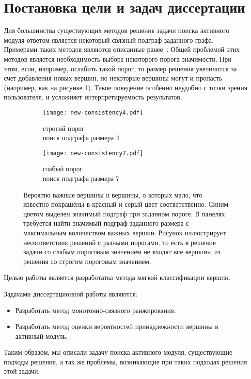 \section{Постановка цели и задач диссертации}
Для большинства существующих методов решения задачи поиска активного модуля
ответом является некоторый связный подграф заданного графа. Примерами таких
методов являются описанные
ранее~\cite{Ideker2002,Dittrich2008a,Alcaraz2012,Sergushichev2016}.  Общей
проблемой этих методов является необходимость выбора некоторого порога
значимости. При этом, если, например, ослабить такой порог, то размер решения
увеличится за счет добавления новых вершин, но некоторые вершины могут
и пропасть (например, как на рисунке \ref{fig:consistency}). Такое поведение
особенно неудобно с точки зрения пользователя, и усложняет интерпретируемость
результатов.
\begin{figure}
    \begin{subfigure}{.45\textwidth}
        \centering
        \texttt{[image: new-consistency4.pdf]}
        \caption{строгий порог\\поиск подграфа размера $4$}
    \end{subfigure} %
    \begin{subfigure}{.45\textwidth}
        \centering
        \texttt{[image: new-consistency7.pdf]}
        \caption{слабый порог\\поиск подграфа размера $7$}
    \end{subfigure}
    \centering
    \caption{
        Вероятно важные вершины и вершины, о которых мало, что известно покрашены
        в красный и серый цвет соответственно.  Синим цветом выделен значимый
        подграф при заданном пороге.  В панелях требуется найти значимый
        подграф заданного размера с максимальным количеством важных вершин.
        Рисунок иллюстрирует несоответствия решений с разными порогами, то есть
        в решение задачи со слабым пороговым значением не входят все вершины из
        решения со строгим пороговым значением.
    }
    \label{fig:consistency}%
\end{figure}

Целью работы является разработатка метода мягкой классификации вершин.

Задачами диссертационной работы являются:
\begin{itemize}
    \item Разработать метод монотонно-связного ранжирования.
    \item Разработать метод оценки вероятностей принадлежности вершины в активный модуль.
\end{itemize}




\chapterconclusion
Таким образом, мы описали задачу поиска активного модуля, существующие подходы решения,
а так же проблемы, возникающие при таких подходах решения этой задачи.

